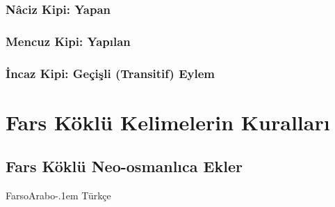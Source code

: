\documentclass[a5paper,12pt, oneside]{scrbook}
\newcommand{\fat}{FarsoArabo\kern -.1em Türkçe}
\begin{document}
\subsection{Nâciz Kipi: Yapan}

\subsection{Mencuz Kipi: Yapılan}

\subsection{İncaz Kipi: Geçişli (Transitif) Eylem}


\chapter{Fars Köklü Kelimelerin Kuralları}
\section{Fars Köklü Neo-osmanlıca Ekler}
\fat
\end{document}
